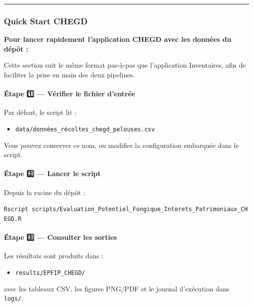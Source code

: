 \begin{center}\rule{0.5\linewidth}{0.5pt}\end{center}

\subsubsection{Quick Start CHEGD}\label{quick-start-chegd}

\textbf{Pour lancer rapidement l'application CHEGD avec les données du
dépôt :}

Cette section suit le même format pas-à-pas que l'application
Inventaires, afin de faciliter la prise en main des deux pipelines.

\paragraph{Étape 1️⃣ --- Vérifier le fichier
d'entrée}\label{uxe9tape-1-vuxe9rifier-le-fichier-dentruxe9e}

Par défaut, le script lit :

\begin{itemize}
\tightlist
\item
  \texttt{data/données\_récoltes\_chegd\_pelouses.csv}
\end{itemize}

Vous pouvez conserver ce nom, ou modifier la configuration embarquée
dans le script.

\paragraph{Étape 2️⃣ --- Lancer le
script}\label{uxe9tape-2-lancer-le-script}

Depuis la racine du dépôt :

\texttt{Rscript\ scripts/Evaluation\_Potentiel\_Fongique\_Interets\_Patrimoniaux\_CHEGD.R}

\paragraph{Étape 3️⃣ --- Consulter les
sorties}\label{uxe9tape-3-consulter-les-sorties}

Les résultats sont produits dans :

\begin{itemize}
\tightlist
\item
  \texttt{results/EPFIP\_CHEGD/}
\end{itemize}

avec les tableaux CSV, les figures PNG/PDF et le journal d'exécution
dans \texttt{logs/}.

